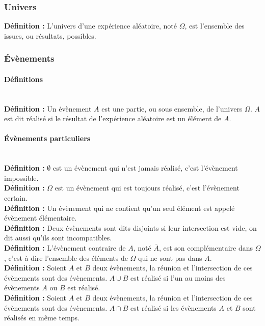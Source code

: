 \documentclass[a4paper,titlepage]{article}
\begin{document}
        \subsubsection{Univers}
            \textbf{Définition :} L’univers d’une expérience aléatoire, noté $\varOmega$, est l’ensemble des issues, ou résultats, possibles.
        \subsubsection{Évènements}
            \paragraph{Définitions}\mbox{}\\
                \textbf{Définition :} Un évènement $A$ est une partie, ou sous ensemble, de l’univers $\varOmega$. $A$ est dit réalisé si le résultat de l’expérience aléatoire est un élément de $A$.
            \paragraph{Évènements particuliers}\mbox{}\\
                \textbf{Définition :} $\emptyset$ est un évènement qui n’est jamais réalisé, c’est l’évènement impossible.
                \\
                \textbf{Définition :} $\varOmega$ est un évènement qui est toujours réalisé, c’est l’évènement certain.
                \\
                \textbf{Définition :} Un évènement qui ne contient qu’un seul élément est appelé évènement élémentaire.
                \\
                \textbf{Définition :} Deux évènements sont dits disjoints si leur intersection est vide, on dit aussi qu’ils sont incompatibles.
                \\
                \textbf{Définition :} L’évènement contraire de $A$, noté $\overline{A}$, est son complémentaire dans $\varOmega$, c’est à dire l’ensemble des éléments de $\varOmega$ qui ne sont pas dans $A$.
                \\
                \textbf{Définition :} Soient $A$ et $B$ deux évènements, la réunion et l’intersection de ces évènements sont des évènements. $A\cup B$ est réalisé si l’un au moins des évènements $A$ ou $B$ est réalisé.
                \\
                \textbf{Définition :} Soient $A$ et $B$ deux évènements, la réunion et l’intersection de ces évènements sont des évènements. $A\cap B$ est réalisé si les évènements $A$ et $B$ sont réalisés en même temps.
\end{document}
